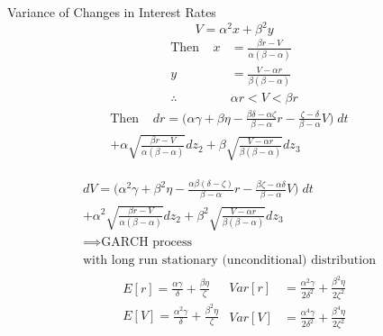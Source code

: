 \documentclass[
14pt,notheorems,hyperref={pdfauthor=whatever}
]{beamer}
\begin{document}
\begin{frame}
Variance of Changes in Interest Rates
\[ V = \alpha^2 x + \beta^2 y \]
\begin{align*}
    \text{Then}\;\;\;\; x &= \frac{\beta r - V}{\alpha(\beta - \alpha)}\\
    y &= \frac{V - \alpha r}{\beta(\beta - \alpha)}\\
    \therefore \;\; &\alpha r < V < \beta r
\end{align*}
\begin{align*}
    \text{Then} \;\;\;\; dr = \bigg(\alpha \gamma + \beta \eta - \frac{\beta\delta - \alpha\zeta}{\beta-\alpha}r - \frac{\zeta-\delta}{\beta-\alpha}V\bigg)\;dt&\\
    + \alpha \sqrt{\frac{\beta r - V}{\alpha(\beta-\alpha)}}dz_2 + \beta\sqrt{\frac{V-\alpha r}{\beta(\beta - \alpha)}}dz_3&
\end{align*}
\end{frame}

\begin{frame}
\begin{align*}
    dV = \bigg(\alpha^2 \gamma + \beta^2 \eta - \frac{\alpha\beta(\delta - \zeta)}{\beta-\alpha}r - \frac{\beta\zeta-\alpha\delta}{\beta-\alpha}V\bigg)\;dt&\\
    + \alpha^2 \sqrt{\frac{\beta r - V}{\alpha(\beta-\alpha)}}dz_2 + \beta^2\sqrt{\frac{V-\alpha r}{\beta(\beta - \alpha)}}dz_3&\\
    \implies \text{GARCH process}&\\
    \text{with long run stationary (unconditional) distribution}&
\end{align*}
\begin{align*}
\begin{split}
    E[r] = \frac{\alpha\gamma}{\delta}+\frac{\beta\eta}{\zeta}\\
    E[V] = \frac{\alpha^2\gamma}{\delta}+\frac{\beta^2\eta}{\zeta}\\
\end{split}
\begin{split}
    Var[r] &= \frac{\alpha^2\gamma}{2\delta^2}+\frac{\beta^2\eta}{2\zeta^2}\\
    Var[V] &= \frac{\alpha^4\gamma}{2\delta^2}+\frac{\beta^4\eta}{2\zeta^2}\\
\end{split}
\end{align*}
\end{frame}
\end{document}
